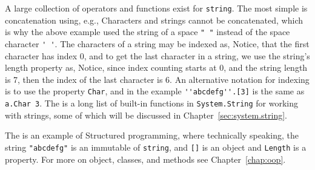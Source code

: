 A large collection of operators and functions exist for \lstinline{string}. The most simple is concatenation using, e.g.,
%
%
%
Characters and strings cannot be concatenated, which is why the above example used the string of  a space \lstinline|" "| instead of the space character \lstinline|' '|. The characters of a string may be indexed as,
%
%
%
Notice, that the first character has index 0, and to get the last character in a string, we use the string's length property as,
%
%
%
Notice, since index counting starts at 0, and the string length is 7, then the index of the last character is 6. An alternative notation for indexing is to use the property \lstinline|Char|, and in the example \lstinline|''abcdefg''.[3]| is the same as \lstinline|a.Char 3|. The is a long list of built-in functions in \lstinline|System.String| for working with strings, some of which will be discussed in Chapter~\ref{sec:system.string}.
 
The  is an example of Structured programming, where technically speaking, the string \lstinline|"abcdefg"| is an immutable  of  \lstinline|string|, and \lstinline|[]| is an object  and \lstinline|Length| is a property. For more on object, classes, and methods see Chapter~\ref{chap:oop}.  

